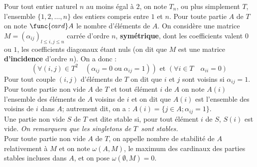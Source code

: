 \documentclass[11pt]{article}%
\begin{document}
Pour tout entier naturel $n$ au moins égal à $2$, on note $T_{n}$, ou
plus
simplement $T$, l'ensemble $\{1,2,\dots,n\}$ des entiers compris entre
$1$
et $n$. Pour toute partie $A$ de $T$ on note $\func{card}A$ le nombre
d'éléments de $A$. On considère une matrice $M = (\alpha
_{ij})_{l\leq i,j\leq n}$ carrée d'ordre $n$, \textbf{symétrique},
dont les coefficients valent $0$ ou $1$, les coefficients diagonaux
étant
nuls (on dit que $M$ est une matrice \textbf{d'incidence} d'ordre $n$).
On a
donc : 
\[
(\forall (i,j)\in T^{2}\quad (\alpha_{ij} = 0\;\text{ou}\;\alpha_{ij} =
1))\text{ et }(\forall i\in T\quad \alpha_{ii} = 0)
\]
Pour tout couple $(i,j)$ d'éléments de $T$ on dit que $i$ et $j$ sont
voisins si $\alpha_{ij} = 1$. Pour toute partie non vide $A$ de $T$ et
tout élément $i$ de $A$ on note $A(i)$ l'ensemble des éléments de $A$
voisins de $i$
et on dit que $A(i)$ est l'ensemble des voisins de $i$ dans $A$;
autrement
dit, on a : $A(i) = \{j\in A;\alpha_{ij} = 1\}$. \\
Une partie non vide $S$ de $T$ est dite stable si, pour tout élément
$i$ de $S$, $S(i)$ est vide. \textit{On remarquera que les singletons
de }$T$\textit{\ sont stables.} \\
Pour toute partie non vide $A$ de $T$, on appelle nombre de stabilité
de $A$
relativement à $M$ et on note $\omega (A,M)$, le maximum des cardinaux
des
parties stables incluses dans $A$, et on pose $\omega (\emptyset,M) =
0$.
\end{document}

